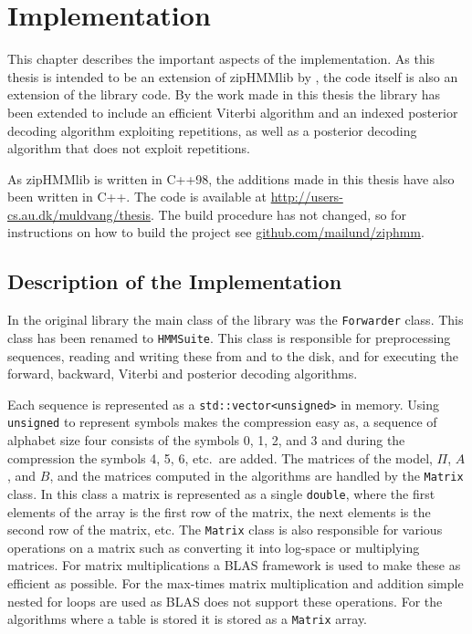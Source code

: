 
\chapter{Implementation}
\label{cha:implementation}

This chapter describes the important aspects of the implementation. As this
thesis is intended to be an extension of zipHMMlib by \citet{sand2013ziphmmlib},
the code itself is also an extension of the library code. By the work made in
this thesis the library has been extended to include an efficient Viterbi
algorithm and an indexed posterior decoding algorithm exploiting
repetitions, as well as a posterior decoding algorithm that does not
exploit repetitions.

As zipHMMlib is written in C++98, the additions made in this thesis have also
been written in C++. The code is available at
\url{http://users-cs.au.dk/muldvang/thesis}. The build procedure has not
changed, so for instructions on how to build the project see
\url{github.com/mailund/ziphmm}.

\section{Description of the Implementation}
\label{sec:descr-impl}

In the original library the main class of the library was the
\texttt{Forwarder} class.  This class has been renamed to \texttt{HMMSuite}.
This class is responsible for preprocessing sequences, reading and writing
these from and to the disk, and for executing the forward, backward, Viterbi
and posterior decoding algorithms.

Each sequence is represented as a \texttt{std::vector<unsigned>} in memory.
Using \texttt{unsigned} to represent symbols makes the compression easy as, a
sequence of alphabet size four consists of the symbols 0, 1, 2, and 3 and
during the compression the symbols 4, 5, 6, etc.\ are added. The matrices of
the model, $\Pi$, $A$, and $B$, and the matrices computed in the algorithms are
handled by the \texttt{Matrix} class. In this class a matrix is represented as
a single \texttt{double}, where the first elements of the array is the first
row of the matrix, the next elements is the second row of the matrix, etc. The
\texttt{Matrix} class is also responsible for various operations on a matrix
such as converting it into log-space or multiplying matrices. For matrix
multiplications a BLAS framework is used to make these as efficient as
possible. For the max-times matrix multiplication and addition simple nested
for loops are used as BLAS does not support these operations. For the
algorithms where a table is stored it is stored as a \texttt{Matrix} array.

